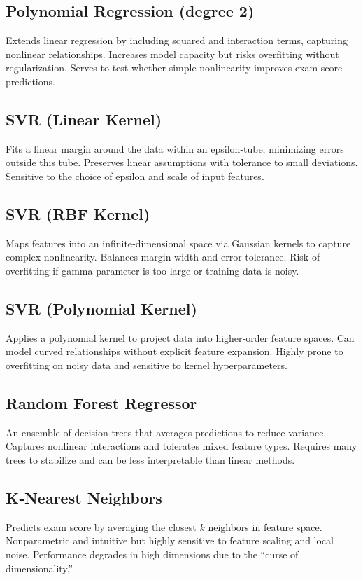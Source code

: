 \documentclass[conference]{IEEEtran}
\begin{document}
\subsection{Polynomial Regression (degree 2)}
Extends linear regression by including squared and interaction terms, capturing nonlinear relationships. Increases model capacity but risks overfitting without regularization. Serves to test whether simple nonlinearity improves exam score predictions.

\subsection{SVR (Linear Kernel)}
Fits a linear margin around the data within an epsilon‐tube, minimizing errors outside this tube. Preserves linear assumptions with tolerance to small deviations. Sensitive to the choice of epsilon and scale of input features.

\subsection{SVR (RBF Kernel)}
Maps features into an infinite‐dimensional space via Gaussian kernels to capture complex nonlinearity. Balances margin width and error tolerance. Risk of overfitting if gamma parameter is too large or training data is noisy.

\subsection{SVR (Polynomial Kernel)}
Applies a polynomial kernel to project data into higher‐order feature spaces. Can model curved relationships without explicit feature expansion. Highly prone to overfitting on noisy data and sensitive to kernel hyperparameters.

\subsection{Random Forest Regressor}
An ensemble of decision trees that averages predictions to reduce variance. Captures nonlinear interactions and tolerates mixed feature types. Requires many trees to stabilize and can be less interpretable than linear methods.

\subsection{K‐Nearest Neighbors}
Predicts exam score by averaging the closest $k$ neighbors in feature space. Nonparametric and intuitive but highly sensitive to feature scaling and local noise. Performance degrades in high dimensions due to the “curse of dimensionality.”
\end{document}
